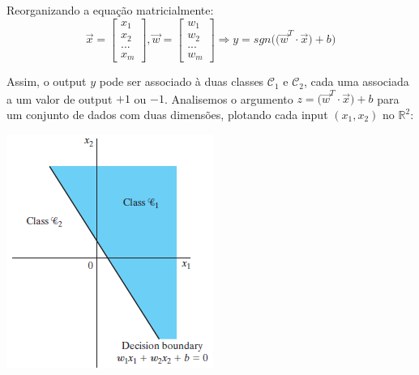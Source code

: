 \documentclass[
	12pt,				%
	oneside,			%
	a4paper,			%
	english,			%
	french,				%
	spanish,			%
	brazil,				%
	]{abntex2}
\begin{document}
Reorganizando a equa\c{c}\~ao matricialmente:
$$ \vec{x} = \begin{bmatrix}
x_1 \\
x_2 \\
... \\
x_m
\end{bmatrix},
\vec{w} = \begin{bmatrix}
w_1 \\
w_2 \\
... \\
w_m
\end{bmatrix} \Rightarrow
y = sgn\bigg( \big(\vec{w}^T\cdot \vec{x}\big) + b \bigg)$$

Assim, o output $y$ pode ser associado à duas classes $\mathcal{C}_1$ e $\mathcal{C}_2$, cada uma associada a um valor de output $+1$ ou $-1$. Analisemos o argumento $z = \big(\vec{w}^T\cdot \vec{x}\big) + b$ para um conjunto de dados com duas dimens\~oes, plotando cada input $(x_1,x_2)$ no $\mathbb{R}^2$:

\begin{center}
	\includegraphics[scale=1]{perceptron2d.png}
\end{center} 
\end{document}
